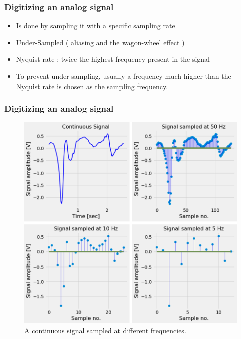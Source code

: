 \documentclass{beamer}
\begin{document}
	\begin{frame}
		\frametitle{Digitizing an analog signal}
		
		\begin{itemize}
			\item 
			Is done by sampling it with a specific sampling rate
			
			\item 
			
			Under-Sampled ( aliasing and the wagon-wheel effect )
			
			\item
			
			 Nyquist rate : twice the highest frequency present in the signal
			 
			 \item
			 
			 To prevent under-sampling, usually a frequency much higher than the Nyquist rate is chosen as the sampling frequency.
			
		\end{itemize}

	\end{frame}

	\begin{frame}
		\frametitle{Digitizing an analog signal}
		
		\begin{center}
			\begin{figure}\label{fig1}
				\includegraphics[scale=0.27]{continious_signal_samples.png}
				\caption{A continuous signal sampled at different frequencies.}
			\end{figure}
		\end{center}

	\end{frame}
\end{document}
